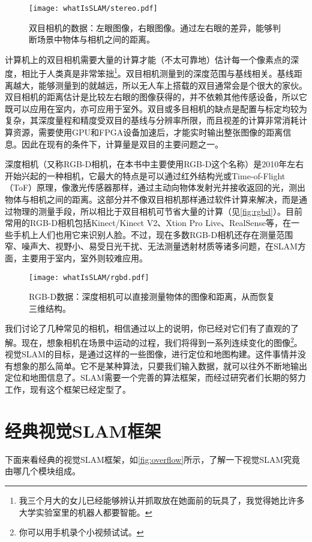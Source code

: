 \begin{figure}[!ht]
	\centering
	\texttt{[image: whatIsSLAM/stereo.pdf]}
	\caption{双目相机的数据：左眼图像，右眼图像。通过左右眼的差异，能够判断场景中物体与相机之间的距离。}
	\label{fig:stereo}
\end{figure}

计算机上的双目相机需要大量的计算才能（不太可靠地）估计每一个像素点的深度，相比于人类真是非常笨拙\footnote{我三个月大的女儿已经能够辨认并抓取放在她面前的玩具了，我觉得她比许多大学实验室里的机器人都要智能。}。双目相机测量到的深度范围与基线相关。基线距离越大，能够测量到的就越远，所以无人车上搭载的双目通常会是个很大的家伙。双目相机的距离估计是比较左右眼的图像获得的，并不依赖其他传感设备，所以它既可以应用在室内，亦可应用于室外。双目或多目相机的缺点是配置与标定均较为复杂，其深度量程和精度受双目的基线与分辨率所限，而且视差的计算非常消耗计算资源，需要使用GPU和FPGA设备加速后，才能实时输出整张图像的距离信息。因此在现有的条件下，计算量是双目的主要问题之一。

深度相机（又称RGB-D相机，在本书中主要使用RGB-D这个名称）是2010年左右开始兴起的一种相机，它最大的特点是可以通过红外结构光或Time-of-Flight（ToF）原理，像激光传感器那样，通过主动向物体发射光并接收返回的光，测出物体与相机之间的距离。这部分并不像双目相机那样通过软件计算来解决，而是通过物理的测量手段，所以相比于双目相机可节省大量的计算（见\autoref{fig:rgbd}）。目前常用的RGB-D相机包括Kinect/Kinect V2、Xtion Pro Live、RealSense等，在一些手机上人们也用它来识别人脸。不过，现在多数RGB-D相机还存在测量范围窄、噪声大、视野小、易受日光干扰、无法测量透射材质等诸多问题，在SLAM方面，主要用于室内，室外则较难应用。

\begin{figure}[!ht]
	\centering
	\texttt{[image: whatIsSLAM/rgbd.pdf]}
	\caption{RGB-D数据：深度相机可以直接测量物体的图像和距离，从而恢复三维结构。}
	\label{fig:rgbd}
\end{figure}

我们讨论了几种常见的相机，相信通过以上的说明，你已经对它们有了直观的了解。现在，想象相机在场景中运动的过程，我们将得到一系列连续变化的图像\footnote{你可以用手机录个小视频试试。}。视觉SLAM的目标，是通过这样的一些图像，进行定位和地图构建。这件事情并没有想象的那么简单。它不是某种算法，只要我们输入数据，就可以往外不断地输出定位和地图信息了。SLAM需要一个完善的算法框架，而经过研究者们长期的努力工作，现有这个框架已经定型了。

\section{经典视觉SLAM框架}
下面来看经典的视觉SLAM框架，如\autoref{fig:overflow}所示，了解一下视觉SLAM究竟由哪几个模块组成。

